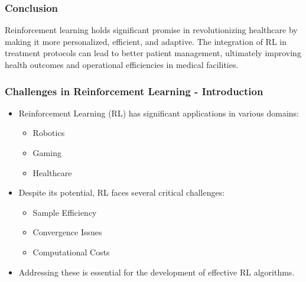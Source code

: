 \documentclass[aspectratio=169]{beamer}
\begin{document}
\begin{frame}[fragile]
  \frametitle{Conclusion}
  Reinforcement learning holds significant promise in revolutionizing healthcare by making it more personalized, efficient, and adaptive. 
  The integration of RL in treatment protocols can lead to better patient management, ultimately improving health outcomes and operational efficiencies in medical facilities.
\end{frame}

\begin{frame}[fragile]
    \frametitle{Challenges in Reinforcement Learning - Introduction}
    \begin{itemize}
        \item Reinforcement Learning (RL) has significant applications in various domains:
        \begin{itemize}
            \item Robotics
            \item Gaming
            \item Healthcare
        \end{itemize}
        \item Despite its potential, RL faces several critical challenges:
        \begin{itemize}
            \item Sample Efficiency
            \item Convergence Issues
            \item Computational Costs
        \end{itemize}
        \item Addressing these is essential for the development of effective RL algorithms.
    \end{itemize}
\end{frame}
\end{document}
